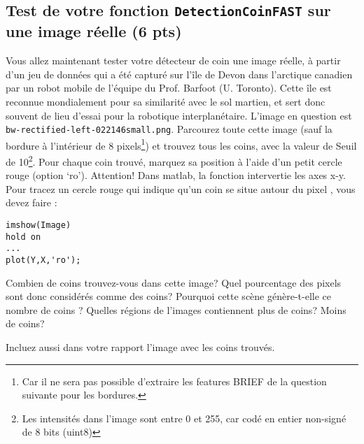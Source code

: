 \documentclass[12pt]{article}
\begin{document}
\subsection{Test de votre fonction \texttt{DetectionCoinFAST} sur une image réelle (6 pts)}
Vous allez maintenant tester votre détecteur de coin une image réelle, à partir d'un jeu de données qui a été capturé sur l'île de Devon dans l'arctique canadien par un robot mobile de l'équipe du Prof.
Barfoot (U. Toronto). Cette île est reconnue mondialement pour sa similarité avec le sol martien, et sert donc souvent de lieu d'essai pour la robotique interplanétaire.
L'image en question est \texttt{bw-rectified-left-022146small.png}.
Parcourez toute cette image (sauf la bordure à l'intérieur de 8 pixels\footnote{Car il ne sera pas possible d'extraire les features BRIEF de la question suivante pour les bordures.}) et trouvez tous les coins, avec la valeur de {Seuil} de 10\footnote{Les intensités dans l'image sont entre 0 et 255, car codé en entier non-signé de 8 bits ({uint8})}.
Pour chaque coin trouvé, marquez sa position à l'aide d'un petit cercle rouge (option {`ro'}).
Attention! Dans matlab, la fonction  intervertie les axes x-y.
Pour tracez un cercle rouge qui indique qu'un coin se situe autour du pixel , vous devez faire :
\vspace{-0.22in}
\begin{lstlisting}
imshow(Image)
hold on
...
plot(Y,X,'ro');
\end{lstlisting}
Combien de coins trouvez-vous dans cette image? Quel pourcentage des pixels sont donc considérés comme des coins? Pourquoi cette scène génère-t-elle ce nombre de coins ? Quelles régions de l'images contiennent plus de coins? Moins de coins?

Incluez aussi dans votre rapport l'image avec les coins trouvés.


\end{document}
